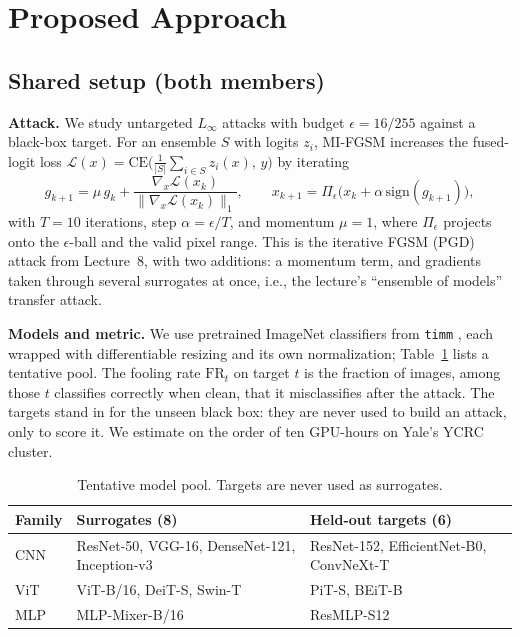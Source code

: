 \documentclass{article}
\begin{document}
\section{Proposed Approach}

\subsection{Shared setup (both members)}

\textbf{Attack.} We study untargeted $L_\infty$ attacks with budget $\epsilon=16/255$ against a black-box target. For an ensemble $S$ with logits $z_i$, MI-FGSM \citep{dong2018boosting} increases the fused-logit loss $\mathcal{L}(x)=\mathrm{CE}\big(\frac{1}{|S|}\sum_{i\in S} z_i(x),\, y\big)$ by iterating
\begin{equation*}
  g_{k+1} = \mu\, g_k + \frac{\nabla_x \mathcal{L}(x_k)}{\lVert \nabla_x \mathcal{L}(x_k) \rVert_1},\qquad
  x_{k+1} = \Pi_{\epsilon}\big(x_k + \alpha\, \mathrm{sign}(g_{k+1})\big),
\end{equation*}
with $T=10$ iterations, step $\alpha=\epsilon/T$, and momentum $\mu=1$, where $\Pi_\epsilon$ projects onto the $\epsilon$-ball and the valid pixel range. This is the iterative FGSM (PGD) attack from Lecture~8, with two additions: a momentum term, and gradients taken through several surrogates at once, i.e., the lecture's ``ensemble of models'' transfer attack.

\textbf{Models and metric.} We use pretrained ImageNet classifiers from \texttt{timm} \citep{wightman2019timm}, each wrapped with differentiable resizing and its own normalization; Table~\ref{tab:models} lists a tentative pool. The fooling rate $\mathrm{FR}_t$ on target $t$ is the fraction of images, among those $t$ classifies correctly when clean, that it misclassifies after the attack. The targets stand in for the unseen black box: they are never used to build an attack, only to score it. We estimate on the order of ten GPU-hours on Yale's YCRC cluster.

\begin{table}[h]
  \caption{Tentative model pool. Targets are never used as surrogates.}
  \label{tab:models}
  \centering
  \small
  \setlength{\tabcolsep}{5pt}
  \begin{tabular}{lll}
    \toprule
    Family & Surrogates (8) & Held-out targets (6) \\
    \midrule
    CNN & ResNet-50, VGG-16, DenseNet-121, Inception-v3 & ResNet-152, EfficientNet-B0, ConvNeXt-T \\
    ViT & ViT-B/16, DeiT-S, Swin-T & PiT-S, BEiT-B \\
    MLP & MLP-Mixer-B/16 & ResMLP-S12 \\
    \bottomrule
  \end{tabular}
\end{table}
\end{document}
